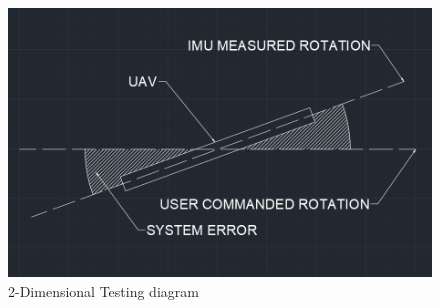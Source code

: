 \documentclass[english]{upeeei}
\begin{document}
\begin{figure}[h]
    \centering
    \includegraphics[scale=0.5]{images/error diagram.PNG}
    \caption{2-Dimensional Testing diagram}
    \label{fig:error_diagram}
\end{figure}
\end{document}
